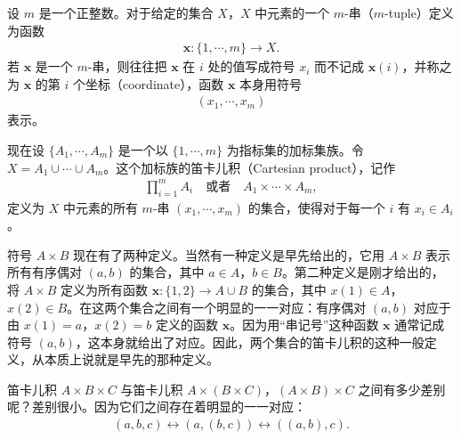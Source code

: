 \documentclass[../../main.tex]{subfiles}
\begin{document}
\begin{definition}[$m$-串]\label{definition:ch01-m串}
设 $m$ 是一个正整数。对于给定的集合 $X$，$X$ 中元素的一个 $m$-串（$m$-tuple）定义为函数
\begin{align*}
\boldsymbol{x}: \{1, \cdots, m\} \longrightarrow X.
\end{align*}
若 $\boldsymbol{x}$ 是一个 $m$-串，则往往把 $\boldsymbol{x}$ 在 $i$ 处的值写成符号 $x_{i}$ 而不记成 $\boldsymbol{x}(i)$，并称之为 $\boldsymbol{x}$ 的第 $i$ 个坐标（coordinate），函数 $\boldsymbol{x}$ 本身用符号
\begin{align*}
(x_{1}, \cdots, x_{m})
\end{align*}
表示。
\end{definition}

现在设 $\{A_{1}, \cdots, A_{m}\}$ 是一个以 $\{1, \cdots, m\}$ 为指标集的加标集族。令 $X = A_{1} \cup \cdots \cup A_{m}$。这个加标族的笛卡儿积（Cartesian product），记作
\begin{align}
\prod_{i=1}^{m} A_{i} \quad \text{或者} \quad A_{1} \times \cdots \times A_{m},\label{align:ch01-m重笛卡儿积}
\end{align}
定义为 $X$ 中元素的所有 $m$-串 $(x_{1}, \cdots, x_{m})$ 的集合，使得对于每一个 $i$ 有 $x_{i} \in A_{i}$。

\begin{example}\label{example:ch01-两种笛卡儿积}
符号 $A \times B$ 现在有了两种定义。当然有一种定义是早先给出的，它用 $A \times B$ 表示所有有序偶对 $(a, b)$ 的集合，其中 $a \in A$，$b \in B$。第二种定义是刚才给出的，将 $A \times B$ 定义为所有函数 $\boldsymbol{x}: \{1, 2\} \longrightarrow A \cup B$ 的集合，其中 $x(1) \in A$，$x(2) \in B$。在这两个集合之间有一个明显的一一对应：有序偶对 $(a, b)$ 对应于由 $x(1) = a$，$x(2) = b$ 定义的函数 $\boldsymbol{x}$。因为用“串记号”这种函数 $\boldsymbol{x}$ 通常记成符号 $(a, b)$，这本身就给出了对应。因此，两个集合的笛卡儿积的这种一般定义，从本质上说就是早先的那种定义。
\end{example}

\begin{example}\label{example:ch01-结合性}
笛卡儿积 $A \times B \times C$ 与笛卡儿积 $A \times (B \times C)$，$(A \times B) \times C$ 之间有多少差别呢？差别很小。因为它们之间存在着明显的一一对应：
\begin{align*}
(a, b, c) \longleftrightarrow (a, (b, c)) \longleftrightarrow ((a, b), c).
\end{align*}
\end{example}
\end{document}
